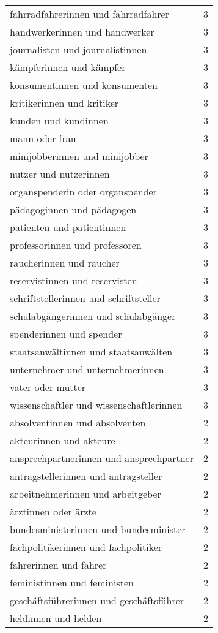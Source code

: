 \begin{tabular}{ll}
fahrradfahrerinnen und fahrradfahrer & 3\\
handwerkerinnen und handwerker & 3\\
journalisten und journalistinnen & 3\\
kämpferinnen und kämpfer & 3\\
konsumentinnen und konsumenten & 3\\
kritikerinnen und kritiker & 3\\
kunden und kundinnen & 3\\
mann oder frau & 3\\
minijobberinnen und minijobber & 3\\
nutzer und nutzerinnen & 3\\
organspenderin oder organspender & 3\\
pädagoginnen und pädagogen & 3\\
patienten und patientinnen & 3\\
professorinnen und professoren & 3\\
raucherinnen und raucher & 3\\
reservistinnen und reservisten & 3\\
schriftstellerinnen und schriftsteller & 3\\
schulabgängerinnen und schulabgänger & 3\\
spenderinnen und spender & 3\\
staatsanwältinnen und staatsanwälten & 3\\
unternehmer und unternehmerinnen & 3\\
vater oder mutter & 3\\
wissenschaftler und wissenschaftlerinnen & 3\\
absolventinnen und absolventen & 2\\
akteurinnen und akteure & 2\\
ansprechpartnerinnen und ansprechpartner & 2\\
antragstellerinnen und antragsteller & 2\\
arbeitnehmerinnen und arbeitgeber & 2\\
ärztinnen oder ärzte & 2\\
bundesministerinnen und bundesminister & 2\\
fachpolitikerinnen und fachpolitiker & 2\\
fahrerinnen und fahrer & 2\\
feministinnen und feministen & 2\\
geschäftsführerinnen und geschäftsführer & 2\\
heldinnen und helden & 2\\

\end{tabular}
